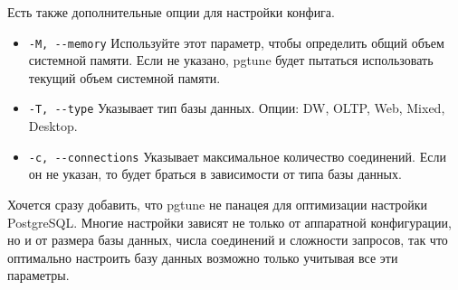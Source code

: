 Есть также дополнительные опции для настройки конфига. 
\begin{itemize}
\item 
\lstinline[frame=single]{-M, --memory}
Используйте этот параметр, чтобы определить общий объем системной памяти. 
Если не указано, pgtune будет пытаться использовать текущий объем системной памяти.

\item 
\lstinline[frame=single]{-T, --type}
Указывает тип базы данных. Опции: DW,  OLTP,  Web, Mixed, Desktop.

\item 
\lstinline[frame=single]{-c, --connections}
Указывает максимальное количество соединений. Если он не указан, то будет браться в зависимости от типа базы данных.

\end{itemize}

Хочется сразу добавить, что pgtune не панацея для оптимизации настройки PostgreSQL. Многие настройки зависят не только от 
аппаратной конфигурации, но и от размера базы данных, числа соединений и сложности запросов, так что оптимально настроить базу данных 
возможно только учитывая все эти параметры.